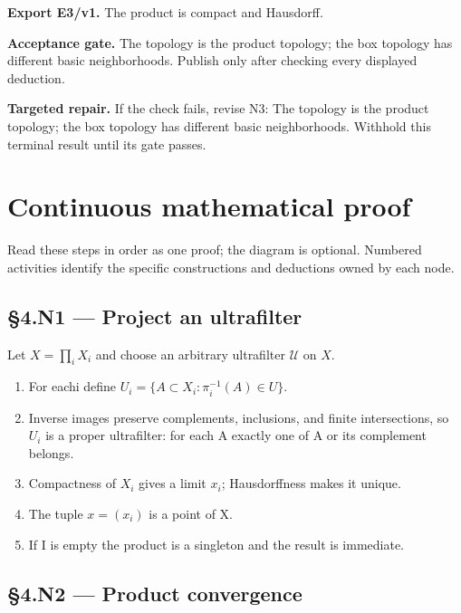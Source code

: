 \documentclass[preprint,12pt,aps,pra,showkeys,amsmath,amssymb,superscriptaddress,floatfix]{revtex4-2}
\theoremstyle{definition}
\theoremstyle{remark}
\newcommand{\field}[2]{\par\smallskip\noindent\textbf{#1.} #2\par}
\begin{document}
\field{Export E3/v1}{The product is compact and Hausdorff.}

\field{Acceptance gate}{The topology is the product topology; the box topology has different
basic neighborhoods. Publish only after checking every displayed
deduction.}

\field{Targeted repair}{If the check fails, revise N3: The topology is the product topology; the
box topology has different basic neighborhoods. Withhold this terminal
result until its gate passes.}

\endgroup\clearpage\section{Continuous mathematical proof}\label{sec:proof}

Read these steps in order as one proof; the diagram is optional.
Numbered activities identify the specific constructions and deductions
owned by each node.

\subsection{§4.N1 --- Project an
ultrafilter}\label{n1-project-an-ultrafilter}

Let \(X=\prod_i X_i\) and choose an arbitrary ultrafilter \(\mathcal U\)
on \(X\).

\begin{enumerate}
\def\labelenumi{\arabic{enumi}.}
\item
  For eachi define \(U_i=\{A\subset X_i:\pi _i^{-1}(A)\in U\}\).
\item
  Inverse images preserve complements, inclusions, and finite
  intersections, so \(U_i\) is a proper ultrafilter: for each A exactly
  one of A or its complement belongs.
\item
  Compactness of \(X_i\) gives a limit \(x_i\); Hausdorffness makes it
  unique.
\item
  The tuple \(x=(x_i)\) is a point of X.
\item
  If I is empty the product is a singleton and the result is immediate.
\end{enumerate}

\subsection{§4.N2 --- Product convergence}\label{n2-product-convergence}
\end{document}
